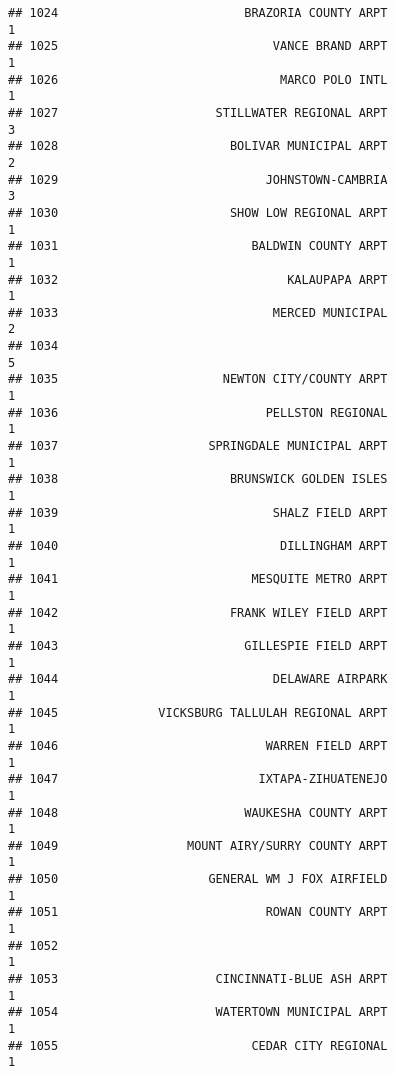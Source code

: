 \documentclass[
]{article}
\begin{document}
\begin{verbatim}
## 1024                          BRAZORIA COUNTY ARPT                           1
## 1025                              VANCE BRAND ARPT                           1
## 1026                               MARCO POLO INTL                           1
## 1027                      STILLWATER REGIONAL ARPT                           3
## 1028                        BOLIVAR MUNICIPAL ARPT                           2
## 1029                             JOHNSTOWN-CAMBRIA                           3
## 1030                        SHOW LOW REGIONAL ARPT                           1
## 1031                           BALDWIN COUNTY ARPT                           1
## 1032                                KALAUPAPA ARPT                           1
## 1033                              MERCED MUNICIPAL                           2
## 1034                                                                         5
## 1035                       NEWTON CITY/COUNTY ARPT                           1
## 1036                             PELLSTON REGIONAL                           1
## 1037                     SPRINGDALE MUNICIPAL ARPT                           1
## 1038                        BRUNSWICK GOLDEN ISLES                           1
## 1039                              SHALZ FIELD ARPT                           1
## 1040                               DILLINGHAM ARPT                           1
## 1041                           MESQUITE METRO ARPT                           1
## 1042                        FRANK WILEY FIELD ARPT                           1
## 1043                          GILLESPIE FIELD ARPT                           1
## 1044                              DELAWARE AIRPARK                           1
## 1045              VICKSBURG TALLULAH REGIONAL ARPT                           1
## 1046                             WARREN FIELD ARPT                           1
## 1047                            IXTAPA-ZIHUATENEJO                           1
## 1048                          WAUKESHA COUNTY ARPT                           1
## 1049                  MOUNT AIRY/SURRY COUNTY ARPT                           1
## 1050                     GENERAL WM J FOX AIRFIELD                           1
## 1051                             ROWAN COUNTY ARPT                           1
## 1052                                                                         1
## 1053                      CINCINNATI-BLUE ASH ARPT                           1
## 1054                      WATERTOWN MUNICIPAL ARPT                           1
## 1055                           CEDAR CITY REGIONAL                           1

\end{verbatim}
\end{document}
